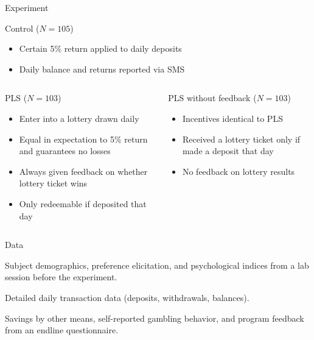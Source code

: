 \documentclass[aspectratio=169]{beamer}
\newenvironment{wideenumerate}{\enumerate\addtolength{\itemsep}{10pt}}{\endenumerate}
\begin{document}
\begin{frame}{Experiment}

	\begin{block}{Control ($N = 105$)}
		\begin{itemize}
		\item Certain 5\% return applied to daily deposits
		\item Daily balance and returns reported via SMS
		\end{itemize}
	\end{block}

	\begin{columns}[T]

		\begin{column}{0.48\textwidth}
			\begin{block}{PLS ($N = 103$)}
			\begin{itemize}
			\item Enter into a lottery drawn daily
			\item Equal in expectation to 5\% return and guarantees no losses
			\item Always given feedback on whether lottery ticket wins
			\item Only redeemable if deposited that day
			\end{itemize}
			\end{block}
		\end{column}

		\begin{column}{0.48\textwidth}
			\begin{block}{PLS without feedback ($N = 103$)}
			\begin{itemize}
			\item Incentives identical to PLS
			\item Received a lottery ticket only if made a deposit that day
			\item No feedback on lottery results
			\end{itemize}
			\end{block}
		\end{column}

	\end{columns}


\end{frame}

\begin{frame}{Data}

	\begin{wideenumerate}
		\item Subject demographics, preference elicitation, and psychological indices from a lab session before the experiment.
		\item Detailed daily transaction data (deposits, withdrawals, balances).
		\item Savings by other means, self-reported gambling behavior, and program feedback from an endline questionnaire.
	\end{wideenumerate}

\end{frame}
\end{document}
